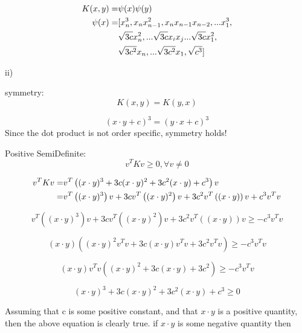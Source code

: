 \documentclass[12pt]{article}
\begin{document}
\begin{align}
    K(x,y) =& \psi(x)\psi(y) \notag \\
    \psi(x) =& [x_n^3,x_nx_{n-1}^2,x_nx_{n-1}x_{n-2},...x_1^3, \notag \\
    &\sqrt{3c}x_n^2,...\sqrt{3c}x_ix_j...\sqrt{3c}x_1^2, \notag \\
    &\sqrt{3c^2}x_n,...\sqrt{3c^2}x_1,\sqrt{c^3}]
\end{align}

ii)

symmetry: 
\begin{equation}
    K(x,y) = K(y,x) 
\end{equation}

\begin{equation}
    (x\cdot y + c)^3 = (y\cdot x + c)^3
\end{equation}
Since the dot product is not order specific, symmetry holds! 

Positive SemiDefinite: 
\begin{equation}
    v^T K v \geq 0, \forall v\neq 0
\end{equation}

\begin{align}
    v^T K v =& v^T\left((x \cdot y)^3  + 3c(x \cdot y)^2 + 3c^2(x \cdot y) + c^3\right)v \notag \\
    =& v^T\left((x \cdot y)^3\right)v + 3cv^T\left((x \cdot y)^2\right)v  + 3c^2v^T\left((x \cdot y)\right)v + c^3v^Tv
\end{align}

\begin{equation}
    v^T\left((x \cdot y)^3\right)v + 3cv^T\left((x \cdot y)^2\right)v  + 3c^2v^T\left((x \cdot y)\right)v \geq -c^3v^Tv
\end{equation}

\begin{equation}
    (x \cdot y)\left((x \cdot y)^2v^Tv + 3c(x \cdot y)v^Tv  + 3c^2v^Tv\right) \geq -c^3v^Tv
\end{equation}

\begin{equation}
    (x \cdot y)v^Tv\left((x \cdot y)^2 + 3c(x \cdot y)  + 3c^2\right) \geq -c^3v^Tv
\end{equation}

\begin{equation}
     (x \cdot y)^3 + 3c(x \cdot y)^2 + 3c^2(x \cdot y) + c^3 \geq 0
\end{equation}

Assuming that c is some positive constant, and that $x \cdot y$ is a positive quantity, then the above equation is 
clearly true. if $x \cdot y$ is some negative quantity then
\end{document}
